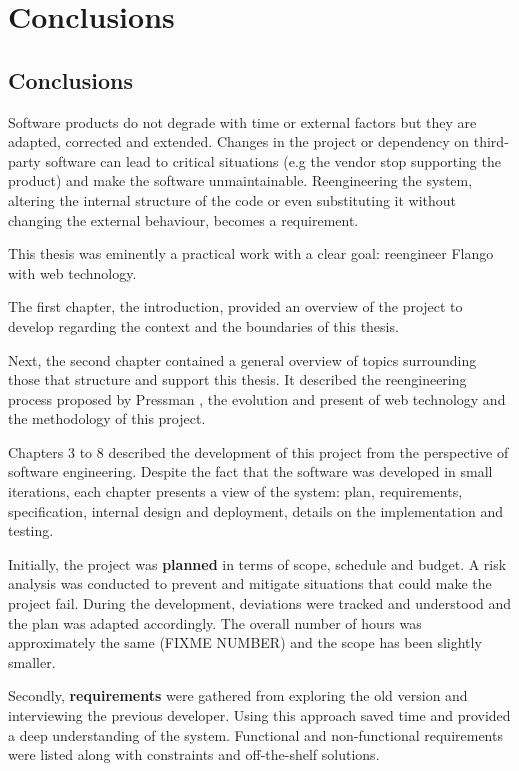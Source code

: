 \chapter{Conclusions}
\section{Conclusions}
Software products do not degrade with time or external factors but they are adapted, corrected and extended.
Changes in the project or dependency on third-party software can lead to critical situations (e.g the vendor stop supporting the product) and make the software unmaintainable.
Reengineering the system, altering the internal structure of the code or even substituting it without changing the external behaviour, becomes a requirement.

This thesis was eminently a practical work with a clear goal: reengineer Flango \cm with web technology.

The first chapter, the introduction, provided an overview of the project to develop regarding the context and the boundaries of this thesis.

Next, the second chapter contained a general overview of topics surrounding those that structure and support this thesis.
It described the reengineering process proposed by Pressman \cite{Pressman:2007}, the evolution and present of web technology and the methodology of this project.

Chapters 3 to 8 described the development of this project from the perspective of software engineering.
Despite the fact that the software was developed in small iterations, each chapter presents a view of the system: plan, requirements, specification, internal design and deployment, details on the implementation and testing.

Initially, the project was \textbf{planned} in terms of scope, schedule and budget. 
A risk analysis was conducted to prevent and mitigate situations that could make the project fail.
During the development, deviations were tracked and understood and the plan was adapted accordingly.
The overall number of hours was approximately the same (FIXME NUMBER) and the scope has been slightly smaller.

Secondly, \textbf{requirements} were gathered from exploring the old version and interviewing the previous developer.
Using this approach saved time and provided a deep understanding of the system.
Functional and non-functional requirements were listed along with constraints and off-the-shelf solutions.

